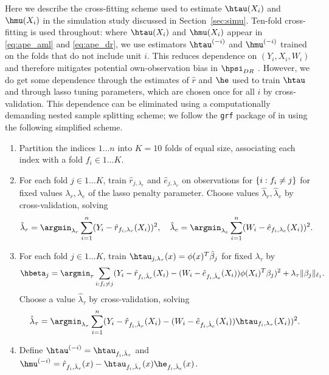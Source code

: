 Here we describe the cross-fitting scheme used to estimate 
$\htau(X_i)$ and $\hmu(X_i)$ in the simulation study discussed in Section~\ref{sec:simu}.
Ten-fold cross-fitting is used throughout: where $\htau(X_i)$ and $\hmu(X_i)$ appear in
\eqref{eq:ape_aml} and \eqref{eq:ape_dr}, we use estimators $\htau^{(-i)}$ and $\hmu^{(-i)}$
trained on the folds that do not include unit $i$. This 
reduces dependence on $(Y_i,X_i,W_i)$ and therefore mitigates potential own-observation bias 
in $\hpsi_{DR}$ \citep[see e.g.,][]{chernozhukov2016double}. However, we do get some dependence
through the estimates of $\hat r$ and $\he$ used to train $\htau$ and
through lasso tuning parameters, which are chosen once for all $i$ by cross-validation.
This dependence can be eliminated using a computationally demanding nested sample splitting scheme;
we follow the \texttt{grf} package of \citet*{athey2016generalized} in using the following simplified scheme.

\begin{enumerate}
\item Partition the indices $1 \ldots n$ into $K=10$ folds of equal size, associating each index with a fold $f_i \in 1 \ldots K$.
\item For each fold $j \in 1 \ldots K$, train $\hat r_{j,\lambda_r}$ and $\hat e_{j,\lambda_e}$ on observations for $\{ i : f_i \neq j\}$
      for fixed values $\lambda_r, \lambda_e$ of the lasso penalty parameter. 
      Choose values $\hat\lambda_r, \hat\lambda_e$  by cross-validation, solving
     \[ \hat\lambda_r = \argmin_{\lambda_r} \sum_{i=1}^n (Y_i - \hat r_{f_i, \lambda_r}(X_i))^2, \quad  \hat\lambda_e = \argmin_{\lambda_e}\sum_{i=1}^n (W_i - \hat e_{f_i, \lambda_e}(X_i))^2. \] 
\item For each fold $j \in 1 \ldots K$, train $\htau_{j,\lambda_{\tau}}(x) = \phi(x)^T \hat\beta_j$ for fixed $\lambda_{\tau}$ by  
\[ \hbeta_{j} = 
        \argmin_{\tau} \sum_{i : f_i \neq j} (Y_i - \hat r_{f_i,\hat\lambda_r}(X_i) - (W_i - \hat e_{f_i,\hat\lambda_e}(X_i)) \phi(X_i)^T \beta_j)^2 + \lambda_{\tau}\norm{\beta_j}_{\ell_1}. \]
Choose a value $\hat\lambda_{\tau}$ by cross-validation, solving
\[ \hat\lambda_{\tau} = \argmin_{\lambda_\tau}\sum_{i=1}^n (Y_i - \hat r_{f_i,\hat\lambda_r}(X_i) - (W_i - \hat e_{f_i,\hat\lambda_e}(X_i)) \htau_{f_i,\lambda_{\tau}}(X_i))^2. \] 
\item Define $\htau^{(-i)}=\htau_{f_i, \hat\lambda_{\tau}}$ and $\hmu^{(-i)}=\hat r_{f_i,\hat\lambda_r}(x)- \htau_{f_i, \hat\lambda_\tau}(x) \he_{f_i,\hat\lambda_e}(x)$.
\end{enumerate}



